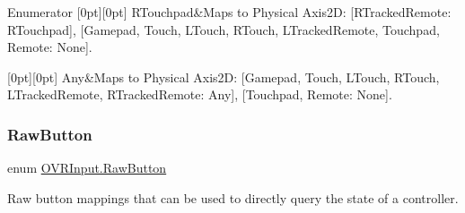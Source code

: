 \begin{DoxyEnumFields}{Enumerator}
[0pt][0pt]{}\mbox{\label{class_o_v_r_input_a973c161bfb3bd6d0cc16c3a0b56c9f4aa589550297d0b2ddda9f8bc62fcb2060e}} 
R\+Touchpad&Maps to Physical Axis2D\+: \mbox{[}R\+Tracked\+Remote\+: R\+Touchpad\mbox{]}, \mbox{[}Gamepad, Touch, L\+Touch, R\+Touch, L\+Tracked\+Remote, Touchpad, Remote\+: None\mbox{]}. \\
\hline

[0pt][0pt]{}\mbox{\label{class_o_v_r_input_a973c161bfb3bd6d0cc16c3a0b56c9f4aaed36a1ef76a59ee3f15180e0441188ad}} 
Any&Maps to Physical Axis2D\+: \mbox{[}Gamepad, Touch, L\+Touch, R\+Touch, L\+Tracked\+Remote, R\+Tracked\+Remote\+: Any\mbox{]}, \mbox{[}Touchpad, Remote\+: None\mbox{]}. \\
\hline

\end{DoxyEnumFields}
\mbox{\label{class_o_v_r_input_a9d6423af820e22b93f0b33a4fc4bf77a}} 
\subsubsection{\texorpdfstring{Raw\+Button}{RawButton}}
{\footnotesize\ttfamily enum \mbox{\hyperlink{class_o_v_r_input_a9d6423af820e22b93f0b33a4fc4bf77a}{O\+V\+R\+Input.\+Raw\+Button}}\hspace{0.3cm}{\ttfamily [strong]}}



Raw button mappings that can be used to directly query the state of a controller. 

